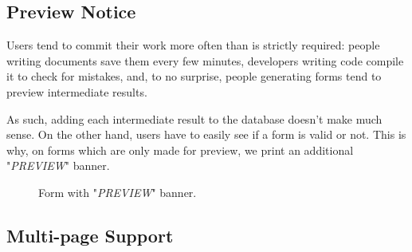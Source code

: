 \documentclass[11pt, a4paper]{report}
\begin{document}
\subsection{Preview Notice}

Users tend to commit their work more often than is strictly required: people writing documents save them every few minutes, developers writing code compile it to check for mistakes, and, to no surprise, people generating forms tend to preview intermediate results.

As such, adding each intermediate result to the database doesn't make much sense. On the other hand, users have to easily see if a form is valid or not. This is why, on forms which are only made for preview, we print an additional "\textit{PREVIEW}" banner.


\begin{figure}[!h]
    \centering
    \caption{Form with "\textit{PREVIEW}" banner.}
    \label{fig:label3}
\end{figure}

\subsection{Multi-page Support}
\end{document}
